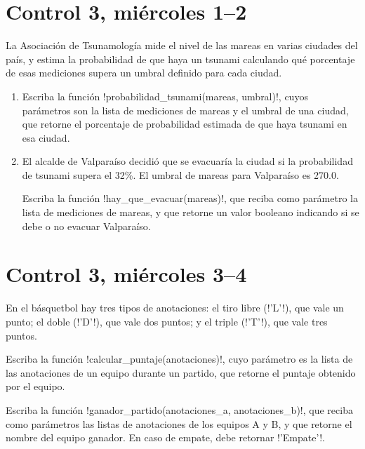 \documentclass[12pt,spanish,a5paper,landscape]{article}
\begin{document}
  \pagestyle{empty}
  \thispagestyle{empty}

  \part*{Control 3, miércoles 1--2}
  \newpage
  La Asociación de Tsunamología mide el nivel de las mareas
  en varias ciudades del país,
  y estima la probabilidad de que haya un tsunami
  calculando qué porcentaje de esas mediciones
  supera un umbral definido para cada ciudad.

  \begin{enumerate}[
    labelindent=-.5in,%
    leftmargin=0pt,%
    labelsep=1em%
  ]
    \item
      Escriba la función \li!probabilidad_tsunami(mareas, umbral)!,
      cuyos parámetros son la lista de mediciones de mareas
      y el umbral de una ciudad,
      que retorne el porcentaje de probabilidad estimada
      de que haya tsunami en esa ciudad.
      

    \item
      El alcalde de Valparaíso decidió que se evacuaría la ciudad
      si la probabilidad de tsunami supera el 32\%.
      El umbral de mareas para Valparaíso es 270.0.

      Escriba la función \li!hay_que_evacuar(mareas)!,
      que reciba como parámetro la lista de mediciones de mareas,
      y que retorne un valor booleano
      indicando si se debe o no evacuar Valparaíso.
      
  \end{enumerate}

  \newpage
  \part*{Control 3, miércoles 3--4}
  \newpage
  En el básquetbol hay tres tipos de anotaciones:
  el tiro libre (\li!'L'!), que vale un punto;
  el doble (\li!'D'!), que vale dos puntos; y
  el triple (\li!'T'!), que vale tres puntos.

  Escriba la función \li!calcular_puntaje(anotaciones)!,
  cuyo parámetro es la lista de las anotaciones
  de un equipo durante un partido,
  que retorne el puntaje obtenido por el equipo.

  Escriba la función \li!ganador_partido(anotaciones_a, anotaciones_b)!,
  que reciba como parámetros las listas de anotaciones
  de los equipos A y B,
  y que retorne el nombre del equipo ganador.
  En caso de empate,
  debe retornar \li!'Empate'!.
\end{document}
